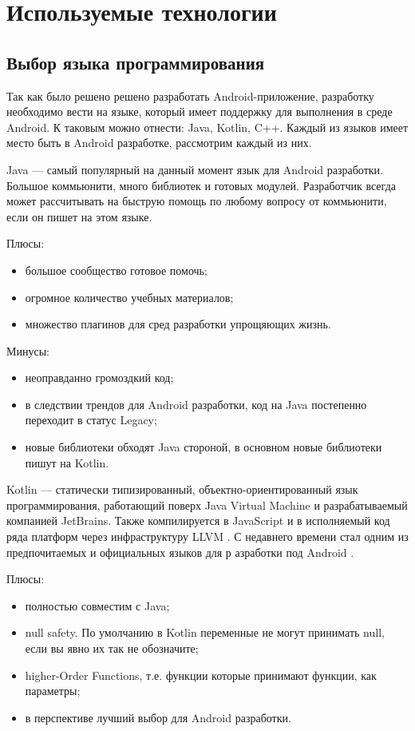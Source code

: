 \section{Используемые технологии}
\label{sec:practice:technology_used}

\subsection{Выбор языка программирования}
Так как было решено решено разработать Android-приложение, разработку необходимо вести на языке, который имеет поддержку для выполнения в среде Android. К таковым можно отнести: Java, Kotlin, C++. Каждый из языков имеет место быть в Android разработке, рассмотрим каждый из них.

Java — самый популярный на данный момент язык для Android разработки. Большое коммьюнити, много библиотек и готовых модулей. Разработчик всегда может рассчитывать на быструю помощь по любому вопросу от коммьюнити, если он пишет на этом языке.

Плюсы:
\begin{itemize}
 \item большое сообщество готовое помочь;
 \item огромное количество учебных материалов;
 \item множество плагинов для сред разработки упрощяющих жизнь.
\end{itemize}

Минусы:
\begin{itemize}
 \item неоправданно громоздкий код;
 \item в следствии трендов для Android разработки, код на Java постепенно переходит в статус Legacy;
 \item новые библиотеки обходят Java стороной, в основном новые библиотеки пишут на Kotlin.
\end{itemize}
 
Kotlin — статически типизированный, объектно-ориентированный язык программирования, работающий поверх Java Virtual Machine и разрабатываемый компанией JetBrains. Также компилируется в JavaScript и в исполняемый код ряда платформ через инфраструктуру LLVM \cite{kotlin1}. С недавнего времени стал одним из предпочитаемых и официальных языков для р азработки под Android \cite{web2}.

Плюсы:
\begin{itemize}
 \item полностью совместим с Java;
 \item null safety. По умолчанию в Kotlin переменные не могут принимать null, если вы явно их так не обозначите;
 \item higher-Order Functions, т.е. функции которые принимают функции, как параметры;
 \item в перспективе лучший выбор для Android разработки.
\end{itemize}

